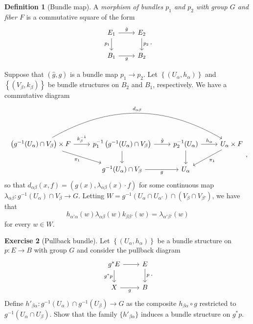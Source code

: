 \documentclass[10pt,letterpaper,cm]{nupset}
\theoremstyle{definition}
\newtheorem{defn}{Definition}[subsection]
\theoremstyle{theorem}
\newtheorem{exercise}[defn]{Exercise}
\theoremstyle{remark}
\newcommand{\1}{\mathbb{1}}
\newcommand{\0}{\vec 0}
\begin{document}
\begin{defn}[Bundle map]
A \textit{morphism of bundles $p_1$ and $p_2$ with group $G$ and fiber $F$} is a commutative square of the form
\[
\begin{tikzcd}
E_1 \arrow[r, "\hat{g}"] \arrow[d, "p_1"'] & E_2 \arrow[d, "p_2"] \\
B_1 \arrow[r, "g"']                        & B_2                 
\end{tikzcd}
.\]
\end{defn}

Suppose that $\left(\hat{g}, g\right)$ is a bundle map $p_1 \to p_2$.  Let $\left\{\left(U_{\alpha}, h_{\alpha}\right)\right\}$ and $\left\{\left(V_{\beta}, k_{\beta}\right)\right\}$ be bundle structures on $B_2$ and $B_1$, respectively.  We have a commutative diagram
\[
\begin{tikzcd}
\left(g^{-1}(U_{\alpha}) \cap V_{\beta}\right) \times F \arrow[rd, "\pi_1"'] \arrow[rrr, "d_{\alpha{\beta}}", bend left] \arrow[r, "k_{\beta}^{-1}"] & p^{-1}_1\left(g^{-1}(U_{\alpha}) \cap V_{\beta}\right) \arrow[d] \arrow[r, "\hat{g}"] & p^{-1}_2(U_{\alpha}) \arrow[d] \arrow[r, "h_{\alpha}"] & U_{\alpha}\times F \arrow[ld, "\pi_1"] \\
                                                                                                                                                         & g^{-1}(U_{\alpha})\cap V_{\beta} \arrow[r, "g"']                                        & U_{\alpha}                                               &                                       
\end{tikzcd}
,\] so that $d_{\alpha{\beta}}(x,f)  = \left(g(x), \lambda_{\alpha{\beta}}(x) \cdot f\right)$ for some continuous map $\lambda_{\alpha{\beta}} : g^{-1}(U_{\alpha})\cap V_{\beta} \to G$. Letting $W = g^{-1}(U_{\alpha} \cap U_{\alpha'}) \cap (V_{\beta} \cap V_{\beta'})$, we have that 
\[
h_{\alpha'{\alpha}}(w)\lambda_{\alpha{\beta}}(w)k_{\beta{\beta'}}(w) = \lambda_{\alpha'{\beta'}}(w) \label{eq:mapcycle} \tag{$\dagger$}
\] for every $w\in W$.

\begin{exercise}[Pullback bundle]
Let  $\left\{\left(U_{\alpha}, h_{\alpha}\right)\right\}$ be a bundle structure on $p: E \to B$ with group $G$ and consider the pullback diagram \[
\begin{tikzcd}
g^{\ast}{E} \arrow[d, "g^{\ast}{p}"'] \arrow[r] & E \arrow[d, "p"] \\
X \arrow[r, "g"']                               & B               
\end{tikzcd}
.\] Define $h'_{\beta{\alpha}}: g^{-1}(U_{\alpha}) \cap g^{-1}(U_{\beta}) \to G$ as the composite $h_{\beta{\alpha}} \circ g$ restricted to  $g^{-1}(U_{\alpha} \cap U_{\beta})$. Show that the family $\{h'_{\beta{\alpha}}\}$ induces a bundle structure on $g^{\ast}{p}$.
\end{exercise}
\end{document}
